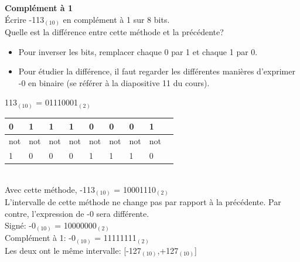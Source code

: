 \begin{Exercice}[5 minutes] \textbf{Complément à 1}\\
    Écrire -113$_{(10)}$ en complément à 1 sur 8 bits. \\

	Quelle est la différence entre cette méthode et la précédente?

    \begin{conseil}
        \begin{itemize}
        	\item Pour inverser les bits, remplacer chaque 0 par 1 et chaque 1 par 0.
        	\item Pour étudier la différence, il faut regarder les différentes manières d'exprimer -0 en binaire (se référer à la diapositive 11 du cours).
        \end{itemize} 
    \end{conseil}
    
    \begin{solution}
    	113$_{(10)}$ = 01110001$_{(2)}$ \\
    	
        \begin{tabular}{| p{1cm} | p{1cm} | p{1cm} | p{1cm} | p{1cm} | p{1cm} | p{1cm} | p{1cm} | p{1cm} |} 
            \hline
            0 & 1 & 1 & 1 & 0 & 0 & 0 & 1 \\ [0.5ex] 
            \hline
            not & not & not & not & not & not & not & not \\ [0.5ex]
            \hline
            1 & 0 & 0 & 0 & 1 & 1 & 1 & 0 \\ [0.5ex]
            \hline
        \end{tabular} \\
        
        Avec cette méthode, -113$_{(10)}$ = 10001110$_{(2)}$ \\
        
        L'intervalle de cette méthode ne change pas par rapport à la précédente. Par contre, l'expression de -0 sera différente.\\
        
        Signé: -0$_{(10)}$ = 10000000$_{(2)}$ \\
        
        Complément à 1: -0$_{(10)}$ = 11111111$_{(2)}$ \\
        
        Les deux ont le même intervalle: [-127$_{(10)}$,+127$_{(10)}$] \\
        
    \end{solution}
\end{Exercice}

